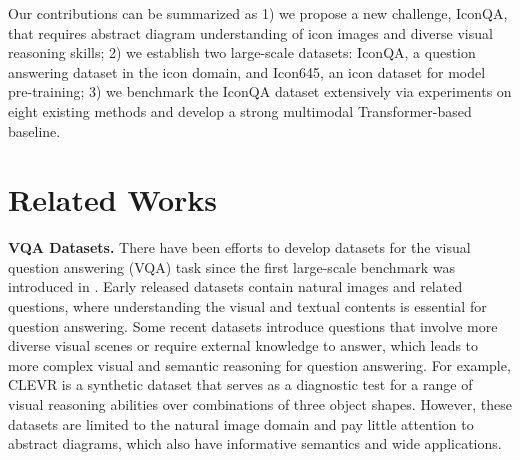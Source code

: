 \documentclass{article}
\begin{document}
Our contributions can be summarized as 1) we propose a new challenge, IconQA, that requires abstract diagram understanding of icon images and diverse visual reasoning skills; 2) we establish two large-scale datasets: IconQA, a question answering dataset in the icon domain, and Icon645, an icon dataset for model pre-training; 3) we benchmark the IconQA dataset extensively via experiments on eight existing methods and develop a strong multimodal Transformer-based baseline.







\section{Related Works}

\textbf{VQA Datasets.} There have been efforts to develop datasets for the visual question answering (VQA) task since the first large-scale benchmark was introduced in \cite{antol2015vqa}. Early released datasets \cite{balanced_vqa_v2,krishna2017visual,singh2019towards,wang2020general} contain natural images and related questions, where understanding the visual and textual contents is essential for question answering. Some recent datasets introduce questions that involve more diverse visual scenes or require external knowledge to answer, which leads to more complex visual and semantic reasoning for question answering. For example, CLEVR \cite{johnson2017clevr} is a synthetic dataset that serves as a diagnostic test for a range of visual reasoning abilities over combinations of three object shapes. However, these datasets are limited to the natural image domain and pay little attention to abstract diagrams, which also have informative semantics and wide applications.
\end{document}
